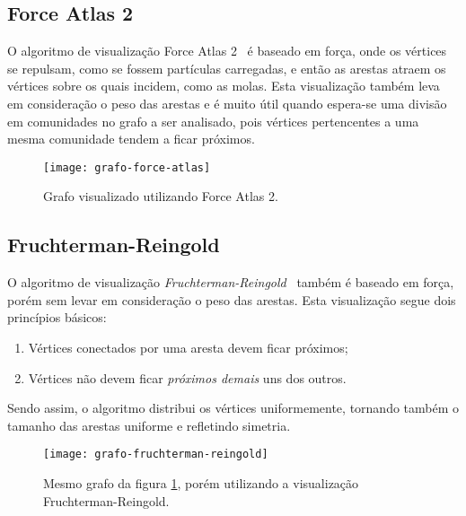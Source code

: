 \subsection{Force Atlas 2}
\label{conceitos__visualizacoes--force-atlas}

O algoritmo de visualização Force Atlas 2~\cite{jacomy2014forceatlas2} é baseado em força, onde os vértices se repulsam, como se fossem partículas carregadas, e então as arestas atraem os vértices sobre os quais incidem, como as molas. Esta visualização também leva em consideração o peso das arestas e é muito útil quando espera-se uma divisão em comunidades no grafo a ser analisado, pois vértices pertencentes a uma mesma comunidade tendem a ficar próximos.

\begin{figure}[H]
\texttt{[image: grafo-force-atlas]}
\centering
\caption{
    Grafo visualizado utilizando Force Atlas 2.
}
\label{fig:grafo-force-atlas}
\end{figure}

\subsection{Fruchterman-Reingold}
\label{conceitos__visualizacoes--fruchterman-reingold}

O algoritmo de visualização \emph{Fruchterman-Reingold}~\cite{fruchterman1991graph} também é baseado em força, porém sem levar em consideração o peso das arestas. Esta visualização segue dois princípios básicos:

\begin{enumerate}
\item Vértices conectados por uma aresta devem ficar próximos;
\item Vértices não devem ficar \emph{próximos demais} uns dos outros.
\end{enumerate}

Sendo assim, o algoritmo distribui os vértices uniformemente, tornando também o tamanho das arestas uniforme e refletindo simetria.

\begin{figure}[H]
\texttt{[image: grafo-fruchterman-reingold]}
\centering
\caption{
    Mesmo grafo da figura \ref{fig:grafo-force-atlas}, porém utilizando a visualização Fruchterman-Reingold.
}
\label{fig:grafo-fruchterman-reingold}
\end{figure}

